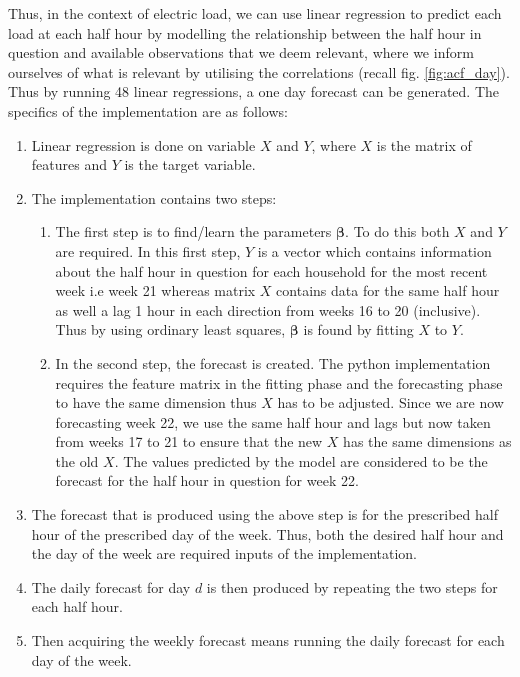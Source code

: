 Thus, in the context of electric load, we can use linear regression to predict each load at each half hour by modelling the relationship between the half hour in question and available observations that we deem relevant, where we inform ourselves of what is relevant by utilising the correlations (recall fig. \ref{fig:acf_day}). Thus by running 48 linear regressions, a one day forecast can be generated. The specifics of the implementation are as follows:
\begin{enumerate}
\item Linear regression is done on variable $X$ and $Y$, where $X$ is the matrix of features and $Y$ is the target variable.
\item The implementation contains two steps: \begin{enumerate} \item The first step is to find/learn the parameters $\boldsymbol \beta$. To do this both $X$ and $Y$ are required. In this first step, $Y$ is a vector which contains information about the half hour in question for each household for the most recent week i.e week 21 whereas matrix $X$ contains data for the same half hour as well a lag 1 hour in each direction from weeks 16 to 20 (inclusive). Thus by using ordinary least squares, $\boldsymbol \beta$ is found by fitting $X$ to $Y$.
\item In the second step, the forecast is created. The python implementation requires the feature matrix in the fitting phase and the forecasting phase to have the same dimension thus $X$ has to be adjusted. Since we are now forecasting week 22, we use the same half hour and lags but now taken from weeks 17 to 21 to ensure that the new $X$ has the same dimensions as the old $X$. The values predicted by the model are considered to be the forecast for the half hour in question for week 22. \end{enumerate}
\item The forecast that is produced using the above step is for the prescribed half hour of the prescribed day of the week. Thus, both the desired half hour and the day of the week are required inputs of the implementation.
\item The daily forecast for day $d$ is then produced by repeating the two steps for each half hour.
\item Then acquiring the weekly forecast means running the daily forecast for each day of the week.
\end{enumerate}

